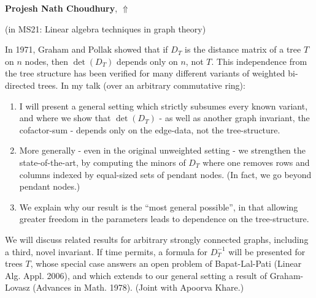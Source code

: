 \documentclass[ILAS2025-program.tex]{subfiles}
\begin{document}
\hypertarget{down0171}{}\begin{ilasabstract}
    
\textbf{Projesh Nath Choudhury},  \hfill \hyperlink{up0171}{$\Uparrow$}
    
    
(in {\color{mstitle}MS21: Linear algebra techniques in graph theory})
        
\mtskip
    In 1971, Graham and Pollak showed that if $D_T$ is the distance matrix of a tree $T$ on $n$ nodes, then $\det(D_T)$ depends only on $n$, not $T$. This independence from the tree structure has been verified for many different variants of weighted bi-directed trees. In my talk (over an arbitrary commutative ring):
\begin{enumerate}
 \item I will present a general setting which strictly subsumes every known variant, and where we show that $\det(D_T)$ - as well as another graph invariant, the cofactor-sum - depends only on the edge-data, not the tree-structure.
 \item More generally - even in the original unweighted setting - we strengthen the state-of-the-art, by computing the minors of $D_T$ where one removes rows and columns indexed by equal-sized sets of pendant nodes. (In fact, we go beyond pendant nodes.)
 \item We explain why our result is the ``most general possible'', in that allowing greater freedom in the parameters leads to dependence on the tree-structure.
\end{enumerate}
We will discuss related results for arbitrary strongly connected graphs, including a third, novel invariant. If time permits, a formula for  $D_T^{-1}$ will be presented for trees $T$, whose special case answers an open problem of Bapat-Lal-Pati (Linear Alg. Appl. 2006), and which extends to our general setting a result of Graham-Lovasz (Advances in Math. 1978). (Joint with Apoorva Khare.)
\end{ilasabstract}
    
\end{document}
